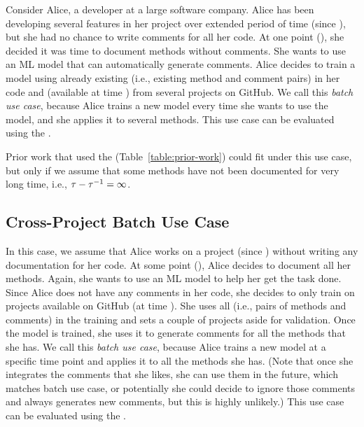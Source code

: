 Consider Alice, a developer at a large software company.  Alice has
been developing several features in her project over extended period
of time (since \atimep), but she had no chance to write comments for
all her code.  At one point (\atime), she decided it was time to
document methods without comments.  
She wants to use an ML model that
can automatically generate comments.  Alice decides to train a model
using already existing \examples (i.e., existing method and comment
pairs) in her code and \examples (available at time \atime) from
several projects on GitHub.  We call this \emph{\ipmode batch use
  case}, because Alice trains a new model every time she wants to use
the model, and she applies it to several methods.  This use case can
be evaluated using the \mixedproj \methodology.

Prior work that used the \mixedproj \methodology
(Table~\ref{table:prior-work}) could fit under this use case, but only
if we assume that some methods have not been documented for very long
time, i.e., $\tau - \tau^{-1} = \infty$.

\subsection{Cross-Project Batch Use Case}

In this case, we assume that Alice works on a project (since \atimep)
without writing any documentation for her code.
%
At some point (\atime), Alice decides to document all her methods.
Again, she wants to use an ML model to help her get the task done.
Since Alice does not have any comments in her code, she decides to
only train on projects available on GitHub (at time \atime).  She uses
all \examples (i.e., pairs of methods and comments) in the training
and sets a couple of projects aside for validation.
%
Once the model is trained, she uses it to generate comments for all
the methods that she has.  We call this \emph{\pmode batch use case},
because Alice trains a new model at a specific time point and applies
it to all the methods she has.  (Note that once she integrates the
comments that she likes, she can use them in the future, which matches
\ipmode batch use case, or potentially she could decide to ignore
those comments and always generates new comments, but this is highly
unlikely.)  This use case can be evaluated using the \crossproj
\methodology.

